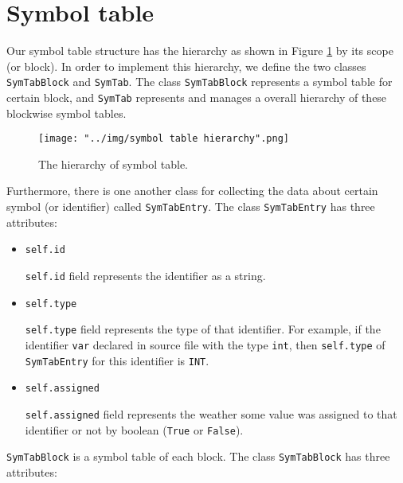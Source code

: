 \documentclass{article}
\newcommand{\code}[1]{\texttt{#1}}
\begin{document}
	\section{Symbol table}
	Our symbol table structure has the hierarchy as shown in Figure \ref{fig: hierarchy of symbol table} by its scope (or block). In order to implement this hierarchy, we define the two classes \code{SymTabBlock} and \code{SymTab}. The class \code{SymTabBlock} represents a symbol table for certain block, and \code{SymTab} represents and manages a overall hierarchy of these blockwise symbol tables.
	
	\begin{figure}[ht]
		\centering
		\texttt{[image: "../img/symbol table hierarchy".png]}
		\caption{The hierarchy of symbol table. \cite{?}}
		\label{fig: hierarchy of symbol table}
	\end{figure}
	
	Furthermore, there is one another class for collecting the data about certain symbol (or identifier) called \code{SymTabEntry}. The class \code{SymTabEntry} has three attributes:
	
	\begin{itemize}
		\item \code{self.id}
		
		\code{self.id} field represents the identifier as a string.
		
		\item \code{self.type}
		
		\code{self.type} field represents the type of that identifier. For example, if the identifier \code{var} declared in source file with the type \code{int}, then \code{self.type} of \code{SymTabEntry} for this identifier is \code{INT}.
		
		\item \code{self.assigned}
		
		\code{self.assigned} field represents the weather some value was assigned to that identifier or not by boolean (\code{True} or \code{False}).
	\end{itemize}
	
	\code{SymTabBlock} is a symbol table of each block. The class \code{SymTabBlock} has three attributes:
	
\end{document}
